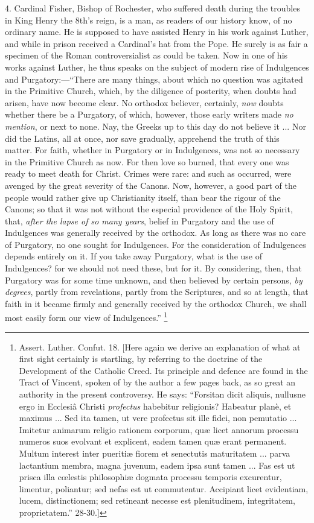 4. Cardinal Fisher, Bishop of Rochester, who suffered death during
the troubles in King Henry the 8th's reign, is a man, as readers of
our history know, of no ordinary name. He is supposed to have assisted
Henry in his work against Luther, and while in prison received a
Cardinal's hat from the Pope. He surely is as fair a specimen of the
Roman controversialist as could be taken. Now in one of his works
against Luther, he thus speaks on the subject of modern rise of
Indulgences and Purgatory:—``There are many things, about which
no question was agitated in the Primitive Church, which, by the
diligence of posterity, when doubts had arisen, have now become clear.
No orthodox believer, certainly, \emph{now} doubts whether there be a
Purgatory, of which, however, those early writers made \emph{no mention},
or next to none. Nay, the Greeks up to this day do not believe it ...
Nor did the Latins, all at once, nor save gradually, apprehend the
truth of this matter. For faith, whether in Purgatory or in
Indulgences, was not so necessary in the Primitive Church as now. For
then love so burned, that every one was ready to meet death for
Christ. Crimes were rare: and such as occurred, were avenged by the
great severity of the Canons. Now, however, a good part of the people
would rather give up Christianity itself, than bear the rigour of the
Canons; so that it was not without the especial providence of the Holy
Spirit, that, \emph{after the lapse of so many years}, belief in
Purgatory and the use of Indulgences was generally received by the
orthodox. As long as there was no care of Purgatory, no one sought for
Indulgences. For the consideration of Indulgences depends entirely on
it. If you take away Purgatory, what is the use of Indulgences? for we
should not need these, but for it. By considering, then, that
Purgatory was for some time unknown, and then believed by certain
persons, \emph{by degrees}, partly from revelations, partly from the
Scriptures, and so at length, that faith in it became firmly and
generally received by the orthodox Church, we shall most easily form
our view of Indulgences.'' \footnote{Assert. Luther. Confut. 18. [Here again we
derive an explanation of what at first sight certainly is startling,
by referring to the doctrine of the Development of the Catholic Creed.
Its principle and defence are found in the Tract of Vincent, spoken of
by the author a few pages back, as so great an authority in the
present controversy. He says: ``Forsitan dicit aliquis, nullusne
ergo in Ecclesiâ Christi \emph{profectus} habebitur religionis?
Habeatur planè, et maximus ... Sed ita tamen, ut vere profectus sit
ille fidei, non pemutatio ... Imitetur animarum religio rationem
corporum, quæ licet annorum processu numeros suos evolvant et
explicent, eadem tamen quæ erant permanent. Multum interest inter
pueritiæ fiorem et senectutis maturitatem ... parva lactantium membra,
magna juvenum, eadem ipsa sunt tamen ... Fas est ut prisca illa cœlestis
philosophiæ dogmata processu temporis excurentur, limentur, poliantur;
sed nefas est ut commutentur. Accipiant licet evidentiam, lucem,
distinctionem; sed retineant necesse est plenitudinem, integritatem,
proprietatem.'' 28-30.]}

